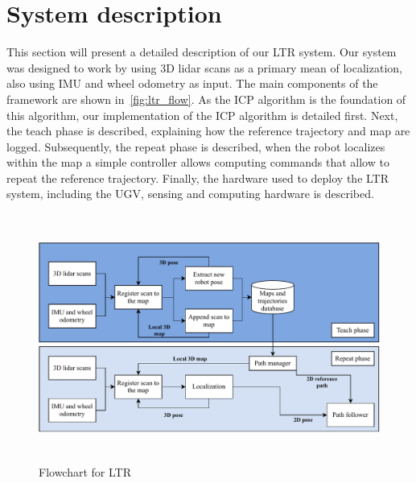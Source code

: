 \section{System description}
\label{sec:sys}

This section will present a detailed description of our \ac{LTR} system. 
Our system was designed to work by using 3D lidar scans as a primary mean of localization, also using \ac{IMU} and wheel odometry as input. 
The main components of the framework are shown in~\autoref{fig:ltr_flow}.
As the \ac{ICP} algorithm is the foundation of this algorithm, our implementation of the \ac{ICP} algorithm is detailed first. 
Next, the teach phase is described, explaining how the reference trajectory and map are logged.
Subsequently, the repeat phase is described, when the robot localizes within the map a simple controller allows computing commands that allow to repeat the reference trajectory.
Finally, the hardware used to deploy the \ac{LTR} system, including the \ac{UGV}, sensing and computing hardware is described.

\begin{figure} [htpb]
	\centering
	\includegraphics[height=3.2in]{figs/LTR_flowchart.pdf}
	\caption{Flowchart for LTR}
	\label{fig:ltr_flow}
\end{figure}

